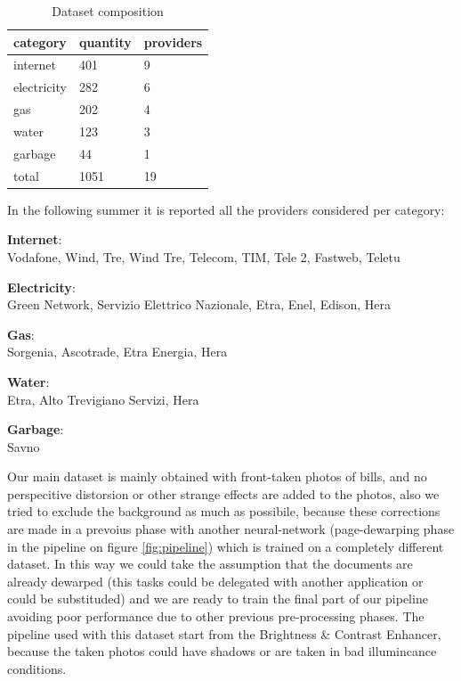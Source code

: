 \documentclass[10pt,twocolumn,letterpaper]{article}
\begin{document}
\begin{table}[!h]
	\begin{center}
		\begin{tabular}{lll}
			\hline
			category    & quantity & providers \\ \hline
			internet    & 401      & 9         \\
			electricity & 282      & 6         \\
			gas         & 202      & 4         \\
			water       & 123      & 3         \\
			garbage     & 44       & 1         \\ \hline
			total       & 1051     & 19        \\ \hline
		\end{tabular}
	\end{center}
	\label{dataset-table}
	\caption{Dataset composition}
\end{table}

In the following summer it is reported all the providers considered per category:\\

\begin{itemize}
\end{itemize}

Our main dataset is mainly obtained with front-taken photos of bills, and no perspecitive distorsion or other strange effects are added to the photos, also we tried to exclude the background as much as possibile, because these corrections are made in a prevoius phase with another neural-network (page-dewarping phase in the pipeline on figure \ref{fig:pipeline}) which is trained on a completely different dataset. In this way we could take the assumption that the documents are already dewarped (this tasks could be delegated with another application or could be substituded) and we are ready to train the final part of our pipeline avoiding poor performance due to other previous pre-processing phases. The pipeline used with this dataset start from the Brightness \& Contrast Enhancer, because the taken photos could have shadows or are taken in bad illumincance conditions. \\
\end{document}

